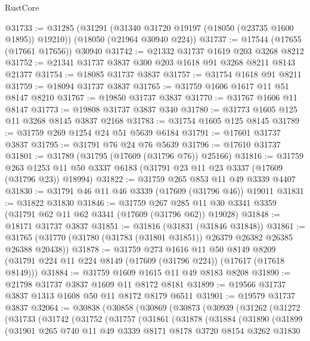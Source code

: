 \begin{lexlean}{RustCore}
\begin{coremodule}
@31733 := @31285
    (@31291 (@31340 @31720 @19197 (@18050 (@23735 @1600 @1895)) @19210))
    (@18050 (@21964 @30940 @224))
@31737 := @17544 (@17655 (@17661 @17656)) @30940
@31742 := @21332 @31737 @1619 @203 @3268 @8212
@31752 := @21341 @31737 @3837 @300 @203 @1618 @91 @3268 @8211 @8143 @21377
@31754 := @18085 @31737 @3837
@31757 := @31754 @1618 @91 @8211
@31759 := @18094 @31737 @3837
@31765 := @31759 @1606 @1617 @11 @51 @8147 @8210
@31767 := @19850 @31737 @3837
@31770 := @31767 @1606 @11 @8147
@31773 := @19808 @31737 @3837 @340
@31780 := @31773 @1605 @125 @11 @3268 @8145 @3837 @2168
@31783 := @31754 @1605 @125 @8145
@31789 := @31759 @269 @1254 @24 @51 @5639 @6184
@31791 := @17601 @31737 @3837
@31795 := @31791 @76 @24 @76 @5639
@31796 := @17610 @31737
@31801 := @31789 (@31795 (@17609 (@31796 @76)) @25166)
@31816 := @31759
    @263
    @1253
    @11
    @50
    @3337
    @6183
    (@31791 @23 @11 @23 @3337 (@17609 (@31796 @23)) @18994)
@31822 := @31759 @265 @853 @11 @49 @3339 @4407
@31830 := @31791 @46 @11 @46 @3339 (@17609 (@31796 @46)) @19011
@31831 := @31822 @31830
@31846 := @31759
    @267
    @285
    @11
    @30
    @3341
    @3359
    (@31791 @62 @11 @62 @3341 (@17609 (@31796 @62)) @19028)
@31848 := @18171 @31737 @3837
@31851 := @31816 (@31831 (@31846 @31848))
@31861 := @31765 (@31770 (@31780 (@31783 (@31801 @31851)) @26379 @26382 @26385 @26388 @20438))
@31878 := @31759
    @273
    @1616
    @11
    @50
    @8149
    @8209
    (@31791 @224 @11 @224 @8149 (@17609 (@31796 @224)) (@17617 (@17618 @8149)))
@31884 := @31759 @1609 @1615 @11 @49 @8183 @8208
@31890 := @21798 @31737 @3837 @1609 @11 @8172 @8181
@31899 := @19566 @31737 @3837 @1313 @1608 @50 @11 @8172 @8179 @6511
@31901 := @19579 @31737 @3837
@32064 := @30838
    (@30858
      (@30869
        (@30873
          (@30939
            (@31262
              (@31272
                (@31733
                  (@31742
                    (@31752
                      (@31757
                        (@31861
                          (@31878
                            (@31884
                              (@31890
                                (@31899
                                  (@31901
                                    @265
                                    @740
                                    @11
                                    @49
                                    @3339
                                    @8171
                                    @8178
                                    @3720
                                    @8154
                                    @3262
                                    @31830

\end{coremodule}
\end{lexlean}
